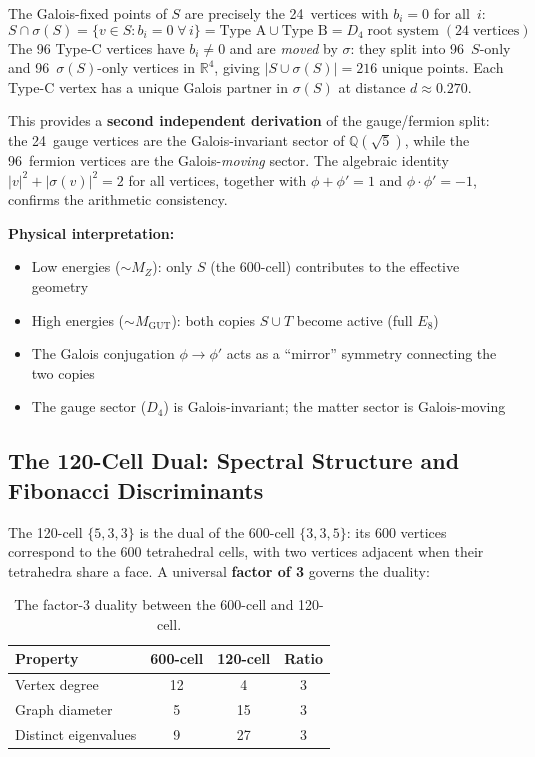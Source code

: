 \documentclass[12pt,a4paper]{article}
\begin{document}
The Galois-fixed points of $S$ are precisely the 24~vertices with $b_i = 0$ for all~$i$:
\begin{equation}
S \cap \sigma(S) = \{v \in S : b_i = 0\; \forall\, i\} = \text{Type A} \cup \text{Type B} = D_4 \;\text{root system}\; (24\;\text{vertices})
\end{equation}
The 96 Type-C vertices have $b_i \neq 0$ and are \emph{moved} by $\sigma$: they split into 96~$S$-only and 96~$\sigma(S)$-only vertices in $\mathbb{R}^4$, giving $|S \cup \sigma(S)| = 216$ unique points. Each Type-C vertex has a unique Galois partner in $\sigma(S)$ at distance $d \approx 0.270$.

This provides a \textbf{second independent derivation} of the gauge/fermion split: the 24~gauge vertices are the Galois-invariant sector of $\mathbb{Q}(\sqrt{5})$, while the 96~fermion vertices are the Galois-\emph{moving} sector. The algebraic identity $|v|^2 + |\sigma(v)|^2 = 2$ for all vertices, together with $\phi + \phi' = 1$ and $\phi \cdot \phi' = -1$, confirms the arithmetic consistency.

\textbf{Physical interpretation:}
\begin{itemize}
    \item Low energies ($\sim M_Z$): only $S$ (the 600-cell) contributes to the effective geometry
    \item High energies ($\sim M_{\text{GUT}}$): both copies $S \cup T$ become active (full $E_8$)
    \item The Galois conjugation $\phi \to \phi'$ acts as a ``mirror'' symmetry connecting the two copies
    \item The gauge sector ($D_4$) is Galois-invariant; the matter sector is Galois-moving
\end{itemize}

\subsection{The 120-Cell Dual: Spectral Structure and Fibonacci Discriminants}
\label{sec:120cell}

The 120-cell $\{5,3,3\}$ is the dual of the 600-cell $\{3,3,5\}$: its 600 vertices correspond to the 600 tetrahedral cells, with two vertices adjacent when their tetrahedra share a face. A universal \textbf{factor of 3} governs the duality:

\begin{table}[H]
\centering
\begin{tabular}{lccc}
\toprule
\textbf{Property} & \textbf{600-cell} & \textbf{120-cell} & \textbf{Ratio} \\
\midrule
Vertex degree & 12 & 4 & 3 \\
Graph diameter & 5 & 15 & 3 \\
Distinct eigenvalues & 9 & 27 & 3 \\
\bottomrule
\end{tabular}
\caption{The factor-3 duality between the 600-cell and 120-cell.}
\end{table}
\end{document}
